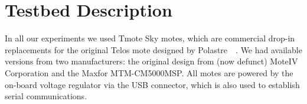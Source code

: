 \chapter{Testbed Description}

In all our experiments we used Tmote Sky motes, which are commercial drop-in replacements for the original Telos mote designed by Polastre~\etal~\cite{Polastre2005}.
We had available versions from two manufacturers: the original design from (now defunct) MoteIV Corporation and the Maxfor MTM-CM5000MSP.
All motes are powered by the on-board voltage regulator via the USB connector, which is also used to establish serial communications.






